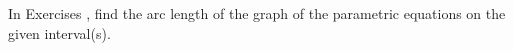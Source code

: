 {\noindent In Exercises}
{, find the arc length of the graph of the parametric equations on the given interval(s).
}
